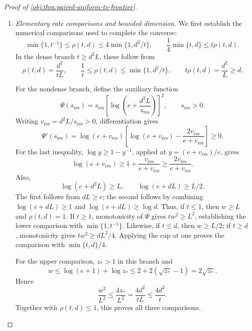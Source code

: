 \begin{proof}[Proof of \cref{obj:thm:paired-uniform-tv-frontier}]
\begin{enumerate}
For \(d>D_{\mathrm{cut}}\), the preceding steps permit
\(\eta_0=\omega=1/100\). Define
\[
c_{\mathrm{large}}
=\min\left\{\frac{s_{\mathrm{app}}^2}{100},
            \frac{s_{\mathrm{app}}}{100}\right\}>0.
\]
Since \(\Delta_{\mathrm{TV}}\ge s_{\mathrm{app}}\sqrt{\rho(t,d)}\),
\[
\begin{aligned}
\mathcal R_{\mathsf K}(\widehat D)
&\ge\frac9{128}\frac{97}{100}\Delta_{\mathrm{TV}}^2
\ge c_{\mathrm{large}}\rho(t,d),\\
\mathcal H_{\mathsf K}(J_{\mathrm{TV}})
&\ge\frac34\frac{77}{100}\Delta_{\mathrm{TV}}
\ge c_{\mathrm{large}}\sqrt{\rho(t,d)}.
\end{aligned}
\]

\item \textit{Elementary rate comparisons and bounded dimension.}
We first establish the numerical comparisons used to complete the converse:
\[
\min\{1,t^{-1}\}\le\rho(t,d)\le4\min\{1,d^2/t\},
\qquad
\frac14\min\{t,d\}\le t\rho(t,d).
\]
In the dense branch \(t\ge d^2L\), these follow from
\[
\rho(t,d)=\frac{d^2}{tL},\qquad
\frac1t\le\rho(t,d)\le\min\{1,d^2/t\},
\qquad
t\rho(t,d)=\frac{d^2}{L}\ge d.
\]

For the nondense branch, define the auxiliary function
\[
\Psi(s_{\mathrm{res}})
=s_{\mathrm{res}}
\left[\log\left(e+\frac{d^2L}{s_{\mathrm{res}}}\right)\right]^2,
\qquad s_{\mathrm{res}}>0.
\]
Writing \(v_{\mathrm{res}}=d^2L/s_{\mathrm{res}}>0\), differentiation gives
\[
\Psi'(s_{\mathrm{res}})
=
\log(e+v_{\mathrm{res}})
\left[
\log(e+v_{\mathrm{res}})
-\frac{2v_{\mathrm{res}}}{e+v_{\mathrm{res}}}
\right]\ge0.
\]
For the last inequality, \(\log y\ge1-y^{-1}\), applied at
\(y=(e+v_{\mathrm{res}})/e\), gives
\[
\log(e+v_{\mathrm{res}})
\ge1+\frac{v_{\mathrm{res}}}{e+v_{\mathrm{res}}}
\ge\frac{2v_{\mathrm{res}}}{e+v_{\mathrm{res}}}.
\]
Also,
\[
\log(e+d^2L)\ge L,
\qquad
\log(e+dL)\ge L/2.
\]
The first follows from \(dL\ge e\); the second follows by combining
\(\log(e+dL)\ge1\) and \(\log(e+dL)\ge\log d\).
Thus, if \(t\le1\), then \(w\ge L\) and \(\rho(t,d)=1\).
If \(t\ge1\), monotonicity of \(\Psi\) gives
\(tw^2\ge L^2\), establishing the lower comparison with \(\min\{1,t^{-1}\}\).
Likewise, if \(t\le d\), then \(w\ge L/2\); if \(t\ge d\), monotonicity gives
\(tw^2\ge dL^2/4\). Applying the cap at one proves the comparison with \(\min\{t,d\}/4\).

For the upper comparison, \(z_*>1\) in this branch and
\[
w\le\log(e+1)+\log z_*
\le2+2(\sqrt{z_*}-1)=2\sqrt{z_*}.
\]
Hence
\[
\frac{w^2}{L^2}\le\frac{4z_*}{L^2}
=\frac{4d^2}{tL}\le\frac{4d^2}{t}.
\]
Together with \(\rho(t,d)\le1\), this proves all three comparisons.


\end{enumerate}
\end{proof}
